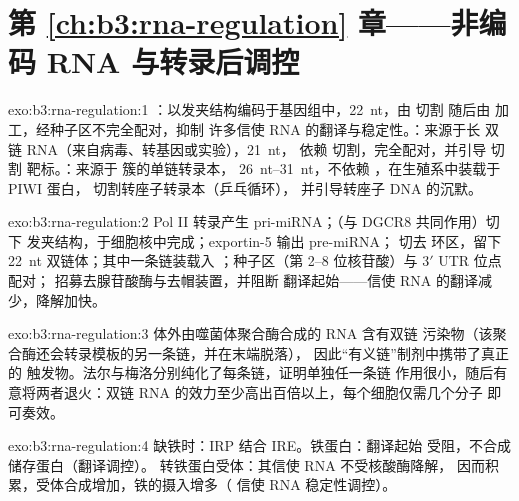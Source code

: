 \section*{第 \ref{ch:b3:rna-regulation} 章——非编码 RNA 与转录后调控}

\begin{solution}{exo:b3:rna-regulation:1}
：以发夹结构编码于基因组中，\qty{22}{nt}，由  切割
随后由  加工，经种子区不完全配对，抑制
许多信使 RNA 的翻译与稳定性。：来源于长
双链 RNA（来自病毒、转基因或实验），\qty{21}{nt}，
依赖  切割，完全配对，并引导  切割
靶标。：来源于  簇的单链转录本，
\qtyrange{26}{31}{nt}，不依赖 ，在生殖系中装载于 PIWI 蛋白，
切割转座子转录本（乒乓循环），
并引导转座子 DNA 的沉默。
\end{solution}

\begin{solution}{exo:b3:rna-regulation:2}
Pol II 转录产生 pri-miRNA；（与 DGCR8 共同作用）切下
发夹结构，于细胞核中完成；exportin-5 输出 pre-miRNA； 切去
环区，留下 \qty{22}{nt} 双链体；其中一条链装载入
；种子区（第 2--8 位核苷酸）与 3$'$ UTR 位点配对；
 招募去腺苷酸酶与去帽装置，并阻断
翻译起始——信使 RNA 的翻译减少，降解加快。
\end{solution}

\begin{solution}{exo:b3:rna-regulation:3}
体外由噬菌体聚合酶合成的 RNA 含有双链
污染物（该聚合酶还会转录模板的另一条链，并在末端脱落），
因此“有义链”制剂中携带了真正的
触发物。法尔与梅洛分别纯化了每条链，证明单独任一条链
作用很小，随后有意将两者退火：双链 RNA
的效力至少高出百倍以上，每个细胞仅需几个分子
即可奏效。
\end{solution}

\begin{solution}{exo:b3:rna-regulation:4}
缺铁时：IRP 结合 IRE。铁蛋白：翻译起始
受阻，不合成储存蛋白（翻译调控）。
转铁蛋白受体：其信使 RNA 不受核酸酶降解，
因而积累，受体合成增加，铁的摄入增多（
信使 RNA 稳定性调控）。
\end{solution}

